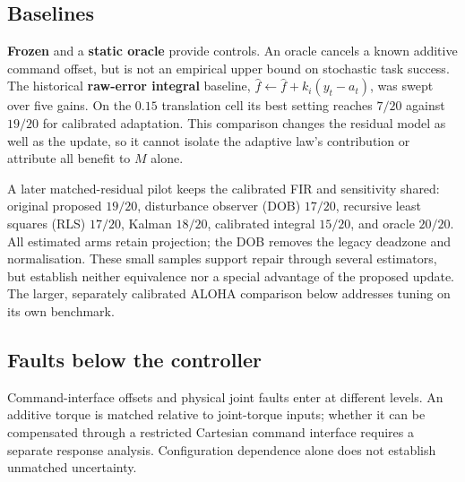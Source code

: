 \documentclass{article}
\newcommand{\fhat}{\hat{f}}
\begin{document}
\subsection{Baselines}
\label{sec:baselines}

\textbf{Frozen} and a \textbf{static oracle} provide controls. An oracle cancels a known
additive command offset, but is not an empirical upper bound on stochastic task success.
The historical \textbf{raw-error integral} baseline,
$\fhat\leftarrow\fhat+k_i(y_t-a_t)$, was swept over five gains. On the $0.15$ translation
cell its best setting reaches $7/20$ against $19/20$ for calibrated adaptation. This
comparison changes the residual model as well as the update, so it cannot isolate the
adaptive law's contribution or attribute all benefit to $M$ alone.

A later matched-residual pilot keeps the calibrated FIR and sensitivity shared:
original proposed $19/20$, disturbance observer (DOB) $17/20$, recursive least squares
(RLS) $17/20$, Kalman $18/20$, calibrated integral $15/20$, and oracle $20/20$.
All estimated arms retain projection; the DOB removes the legacy deadzone and
normalisation. These small samples support repair through several estimators, but establish
neither equivalence nor a special advantage of the proposed update. The larger, separately
calibrated ALOHA comparison below addresses tuning on its own benchmark.

\subsection{Faults below the controller}
\label{sec:joint}

Command-interface offsets and physical joint faults enter at different levels. An additive
torque is matched relative to joint-torque inputs; whether it can be compensated through
a restricted Cartesian command interface requires a separate response analysis.
Configuration dependence alone does not establish unmatched uncertainty.
\end{document}
